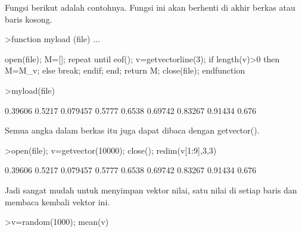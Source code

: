 \documentclass[a4paper,10pt]{article}
\begin{document}
\begin{eulernotebook}
\begin{eulercomment}
\begin{eulercomment}
\begin{eulercomment}
\begin{eulercomment}
\begin{eulercomment}
\begin{eulercomment}
\begin{eulercomment}
\begin{eulercomment}
\begin{eulercomment}
\begin{eulercomment}
\begin{eulercomment}
\begin{eulercomment}
\begin{eulercomment}
\begin{eulercomment}
\begin{eulercomment}
\begin{eulercomment}
\begin{eulercomment}
\begin{eulercomment}
\begin{eulercomment}
\begin{eulercomment}
\begin{eulercomment}
\begin{eulercomment}
\begin{eulercomment}
\begin{eulercomment}
\begin{eulercomment}
\begin{eulercomment}
\begin{eulercomment}
\begin{eulercomment}
\begin{eulercomment}
\begin{eulercomment}
\begin{eulercomment}
\begin{eulercomment}
\begin{eulercomment}
\begin{eulercomment}
\begin{eulercomment}
\begin{eulercomment}
\begin{eulercomment}
Fungsi berikut adalah contohnya. Fungsi ini akan berhenti di akhir
berkas atau baris kosong.
\end{eulercomment}
\begin{eulerprompt}
>function myload (file) ...
\end{eulerprompt}
\begin{eulerudf}
  open(file);
  M=[];
  repeat
     until eof();
     v=getvectorline(3);
     if length(v)>0 then M=M_v; else break; endif;
  end;
  return M;
  close(file);
  endfunction
\end{eulerudf}
\begin{eulerprompt}
>myload(file)
\end{eulerprompt}
\begin{euleroutput}
    0.39606    0.5217  0.079457 
     0.5777    0.6538   0.69742 
    0.83267   0.91434     0.676 
\end{euleroutput}
\begin{eulercomment}
Semua angka dalam berkas itu juga dapat dibaca dengan getvector().
\end{eulercomment}
\begin{eulerprompt}
>open(file); v=getvector(10000); close(); redim(v[1:9],3,3)
\end{eulerprompt}
\begin{euleroutput}
    0.39606    0.5217  0.079457 
     0.5777    0.6538   0.69742 
    0.83267   0.91434     0.676 
\end{euleroutput}
\begin{eulercomment}
Jadi sangat mudah untuk menyimpan vektor nilai, satu nilai di setiap
baris dan membaca kembali vektor ini.
\end{eulercomment}
\begin{eulerprompt}
>v=random(1000); mean(v)
\end{eulerprompt}

\end{eulercomment}
\end{eulercomment}
\end{eulercomment}
\end{eulercomment}
\end{eulercomment}
\end{eulercomment}
\end{eulercomment}
\end{eulercomment}
\end{eulercomment}
\end{eulercomment}
\end{eulercomment}
\end{eulercomment}
\end{eulercomment}
\end{eulercomment}
\end{eulercomment}
\end{eulercomment}
\end{eulercomment}
\end{eulercomment}
\end{eulercomment}
\end{eulercomment}
\end{eulercomment}
\end{eulercomment}
\end{eulercomment}
\end{eulercomment}
\end{eulercomment}
\end{eulercomment}
\end{eulercomment}
\end{eulercomment}
\end{eulercomment}
\end{eulercomment}
\end{eulercomment}
\end{eulercomment}
\end{eulercomment}
\end{eulercomment}
\end{eulercomment}
\end{eulercomment}
\end{eulernotebook}
\end{document}
